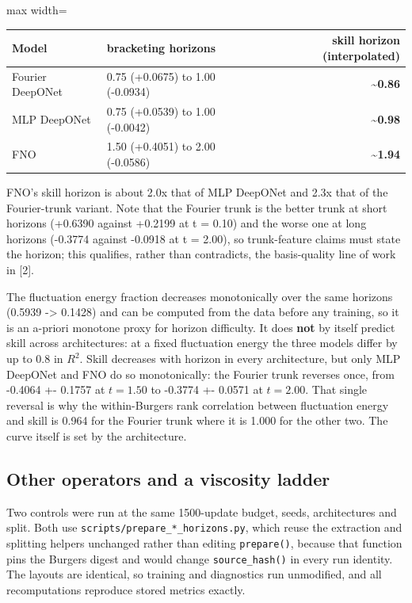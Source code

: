 \documentclass[preprint,12pt]{elsarticle}
\begin{document}
\begin{center}
\begin{adjustbox}{max width=\linewidth}
\small
\begin{tabular}{llr}
\toprule
Model & bracketing horizons & \textbf{skill horizon (interpolated)} \\
\midrule
Fourier DeepONet & 0.75 (+0.0675) to 1.00 (-0.0934) & \textbf{\textasciitilde{}0.86} \\
MLP DeepONet & 0.75 (+0.0539) to 1.00 (-0.0042) & \textbf{\textasciitilde{}0.98} \\
FNO & 1.50 (+0.4051) to 2.00 (-0.0586) & \textbf{\textasciitilde{}1.94} \\
\bottomrule
\end{tabular}
\end{adjustbox}
\end{center}


FNO's skill horizon is about 2.0x that of MLP DeepONet and 2.3x that of the Fourier-trunk variant. Note that the Fourier trunk is the better trunk at short horizons (+0.6390 against +0.2199 at t = 0.10) and the worse one at long horizons (-0.3774 against -0.0918 at t = 2.00), so trunk-feature claims must state the horizon; this qualifies, rather than contradicts, the basis-quality line of work in [2].

The fluctuation energy fraction decreases monotonically over the same horizons (0.5939 -> 0.1428) and can be computed from the data before any training, so it is an a-priori monotone proxy for horizon difficulty. It does \textbf{not} by itself predict skill across architectures: at a fixed fluctuation energy the three models differ by up to 0.8 in $R^2$. Skill decreases with horizon in every architecture, but only MLP DeepONet and FNO do so monotonically: the Fourier trunk reverses once, from -0.4064 +- 0.1757 at $t = 1.50$ to -0.3774 +- 0.0571 at $t = 2.00$. That single reversal is why the within-Burgers rank correlation between fluctuation energy and skill is 0.964 for the Fourier trunk where it is 1.000 for the other two. The curve itself is set by the architecture.

\subsection{Other operators and a viscosity ladder}

Two controls were run at the same 1500-update budget, seeds, architectures and split. Both use \texttt{scripts/prepare\_*\_horizons.py}, which reuse the extraction and splitting helpers unchanged rather than editing \texttt{prepare()}, because that function pins the Burgers digest and would change \texttt{source\_hash()} in every run identity. The layouts are identical, so training and diagnostics run unmodified, and all recomputations reproduce stored metrics exactly.
\end{document}
